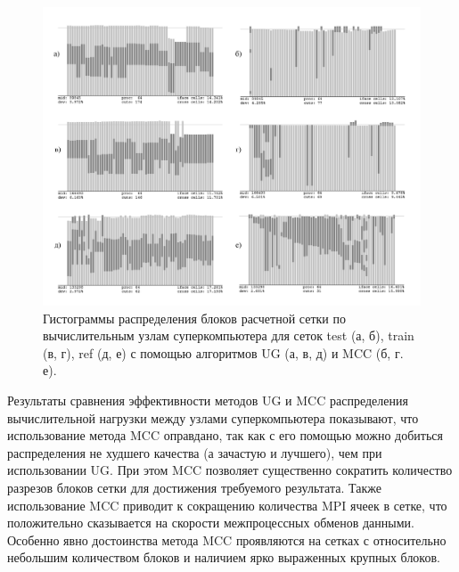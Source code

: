 \begin{figure}[ht]
\centering
\includegraphics[width=1.0\textwidth]{./pics/text_2_withcut/2-merged-pic.pdf}
\singlespacing
{}\caption{Гистограммы распределения блоков расчетной сетки по вычислительным узлам суперкомпьютера для сеток test (а, б), train (в, г), ref (д, е) с помощью алгоритмов UG (а, в, д) и MCC (б, г. е).}
\label{fig:text_2_withcut_2_merged_pic}
\end{figure}

Результаты сравнения эффективности методов UG и MCC распределения вычислительной нагрузки между узлами суперкомпьютера показывают, что использование метода MCC оправдано, так как с его помощью можно добиться распределения не худшего качества (а зачастую и лучшего), чем при использовании UG.
При этом MCC позволяет существенно сократить количество разрезов блоков сетки для достижения требуемого результата.
Также использование MCC приводит к сокращению количества MPI ячеек в сетке, что положительно сказывается на скорости межпроцессных обменов данными.
Особенно явно достоинства метода MCC проявляются на сетках с относительно небольшим количеством блоков и наличием ярко выраженных крупных блоков.

